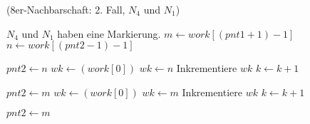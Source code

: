 \begin{algorithm}[ht]
\caption{ (8er-Nachbarschaft: 2. Fall, $N_4$ und $N_1$)}
\label{alg:arlabeling-neighbour-case2-2}
\begin{algorithmic}[1]
	\State \Comment $N_4$ und $N_1$ haben eine Markierung.
	\State $m \gets \mathit{work}\left[\left(\mathit{pnt1} + 1\right) - 1\right]$ 
	\State $n \gets \mathit{work}\left[\left(\mathit{pnt2} - 1\right) - 1\right]$ 

	 
		\State $\mathit{pnt2} \gets n$ 
		\State $\mathit{wk} \gets \left(\mathit{work}\left[0\right]\right)$ 
		 
			 
				\State $\mathit{wk} \gets n$ 
			\EndIf
			\State Inkrementiere $\mathit{wk}$ 
			\State $k \gets k + 1$ 
		\EndFor

		\State $\mathit{pnt2} \gets m$
		\State $\mathit{wk} \gets \left(\mathit{work}\left[0\right]\right)$
				\State $\mathit{wk} \gets m$
			\EndIf
			\State Inkrementiere $\mathit{wk}$
			\State $k \gets k + 1$
		\EndFor

	\Else
		\State $\mathit{pnt2} \gets m$
	\EndIf
\end{algorithmic}
\end{algorithm}
